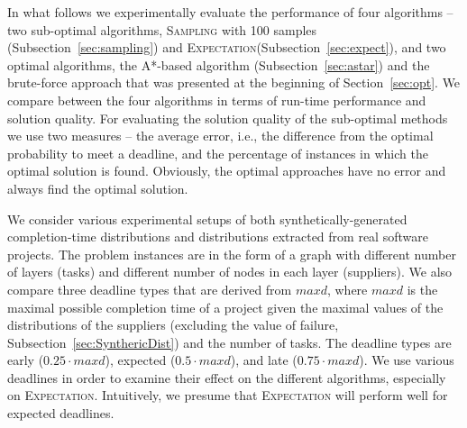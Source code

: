 \documentclass[letterpaper]{article} %
\newcommand{\samd}{\ac{SAMD}\xspace}
\newcommand{\astar}{\textsc{A*}\xspace}
\newcommand{\sampling}{\textsc{Sampling}\xspace}
\newcommand{\expectation}{\textsc{Expectation}\xspace}
\begin{document}
In what follows we experimentally evaluate the performance of four algorithms -- two sub-optimal algorithms, \sampling with 100 samples (Subsection~\ref{sec:sampling}) and \expectation (Subsection~\ref{sec:expect}), and two optimal algorithms, the \astar-based algorithm (Subsection~\ref{sec:astar}) and the brute-force approach that was presented at the beginning of Section~\ref{sec:opt}.
We compare between the four algorithms in terms of run-time performance and solution quality. For evaluating the solution quality of the sub-optimal methods we use two measures -- the average error, i.e., the difference from the optimal probability to meet a deadline, and the percentage of instances in which the optimal solution is found. Obviously, the optimal approaches have no error and always find the optimal solution.

We consider various experimental setups of both synthetically-generated completion-time distributions and distributions extracted from real software projects. The problem instances are in the form of a graph with different number of layers (tasks) and different number of nodes in each layer (suppliers). We also compare three deadline types that are derived from $maxd$, where $maxd$ is the maximal possible completion time of a project given the maximal values of the distributions of the suppliers (excluding the value of failure, Subsection~\ref{sec:SynthericDist}) and the number of tasks. The deadline types are early ($0.25\cdot maxd$), expected ($0.5\cdot maxd$), and late ($0.75\cdot maxd$). We use various deadlines in order to examine their effect on the different algorithms, especially on \expectation. Intuitively, we presume that \expectation will perform well for expected deadlines.
\end{document}
